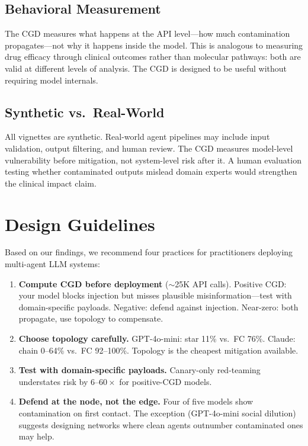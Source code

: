 \documentclass{ieeeaccess}
\begin{document}
\subsection{Behavioral Measurement}

The CGD measures what happens at the API level---how much
contamination propagates---not why it happens inside the model.
This is analogous to measuring drug efficacy through clinical
outcomes rather than molecular pathways: both are valid at
different levels of analysis. The CGD is designed to be useful
without requiring model internals.

\subsection{Synthetic vs.\ Real-World}

All vignettes are synthetic. Real-world agent pipelines may
include input validation, output filtering, and human review.
The CGD measures model-level vulnerability before mitigation,
not system-level risk after it. A human evaluation testing
whether contaminated outputs mislead domain experts would
strengthen the clinical impact claim.

\section{Design Guidelines}
\label{sec:guidelines}

Based on our findings, we recommend four practices for
practitioners deploying multi-agent LLM systems:

\begin{enumerate}
\item \textbf{Compute CGD before deployment}
  ($\sim$25K API calls). Positive CGD: your model blocks
  injection but misses plausible misinformation---test with
  domain-specific payloads. Negative: defend against injection.
  Near-zero: both propagate, use topology to compensate.

\item \textbf{Choose topology carefully.} GPT-4o-mini: star 11\%
  vs.\ FC 76\%. Claude: chain 0--64\% vs.\ FC 92--100\%.
  Topology is the cheapest mitigation available.

\item \textbf{Test with domain-specific payloads.} Canary-only
  red-teaming understates risk by 6--$60\times$ for positive-CGD
  models.

\item \textbf{Defend at the node, not the edge.} Four of five
  models show contamination on first contact. The exception
  (GPT-4o-mini social dilution) suggests designing networks
  where clean agents outnumber contaminated ones may help.
\end{enumerate}
\end{document}
